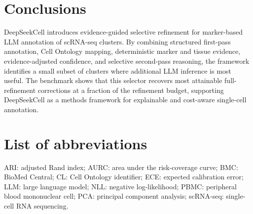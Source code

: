 \documentclass[referee,lineno,pdflatex]{sn-jnl}
\begin{document}
\section{Conclusions}\label{sec:conclusions}

DeepSeekCell introduces evidence-guided selective refinement for marker-based LLM annotation of scRNA-seq clusters. By combining structured first-pass annotation, Cell Ontology mapping, deterministic marker and tissue evidence, evidence-adjusted confidence, and selective second-pass reasoning, the framework identifies a small subset of clusters where additional LLM inference is most useful. The benchmark shows that this selector recovers most attainable full-refinement corrections at a fraction of the refinement budget, supporting DeepSeekCell as a methods framework for explainable and cost-aware single-cell annotation.

\section*{List of abbreviations}

ARI: adjusted Rand index; AURC: area under the risk-coverage curve; BMC: BioMed Central; CL: Cell Ontology identifier; ECE: expected calibration error; LLM: large language model; NLL: negative log-likelihood; PBMC: peripheral blood mononuclear cell; PCA: principal component analysis; scRNA-seq: single-cell RNA sequencing.

\backmatter

\end{document}
